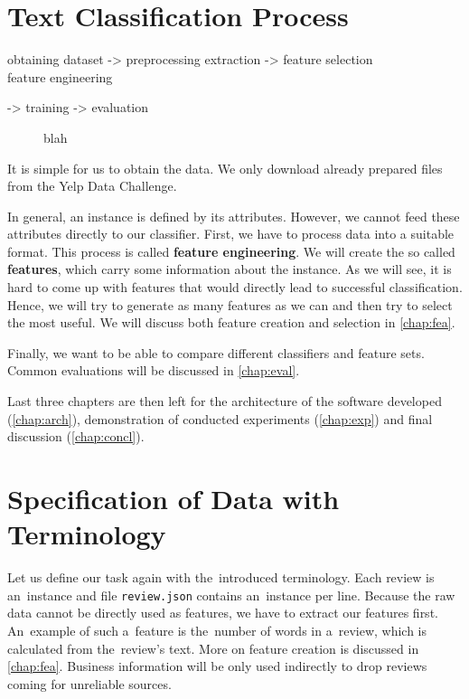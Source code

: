 \section{Text Classification Process}

\begin{code}
obtaining dataset
-> preprocessing {extraction} -> feature selection
 ^^^^^^^^^^^^^^^^^^^^^^^^^^^^^^^^^^^^^^^^^^^^^^^^^^^^^^
    		feature engineering

-> training -> evaluation
\end{code}
\begin{figure}
	blah
	\label{fig:cls_process}
\end{figure}

It is simple for us to obtain the data. We only download already prepared files from the Yelp Data Challenge.

In general, an instance is defined by its attributes.
However, we cannot feed these attributes directly to our classifier.
First, we have to process data into a suitable format. This process is called {\bf feature engineering}.
We will create the so called {\bf features}, which carry some information about the instance.
As we will see, it is hard to come up with features that would directly lead to successful classification.
Hence, we will try to generate as many features as we can and then try to select the most useful.
We will discuss both feature creation and selection in \autoref{chap:fea}.


Finally, we want to be able to compare different classifiers and feature sets. Common evaluations will be discussed in \ref{chap:eval}.

Last three chapters are then left for the architecture of the software developed (\autoref{chap:arch}), demonstration of conducted experiments (\autoref{chap:exp}) and final discussion (\autoref{chap:concl}).


\section{Specification of Data with Terminology}

Let us define our task again with the~introduced terminology.
Each review is an~instance and file \texttt{review.json} contains an~instance per line.
Because the raw data cannot be directly used as features, we have to extract our features first.
An~example of such a~feature is the~number of words in a~review, which is calculated from the~review's text.
More on feature creation is discussed in \autoref{chap:fea}.
Business information will be only used indirectly to drop reviews coming for unreliable sources.


